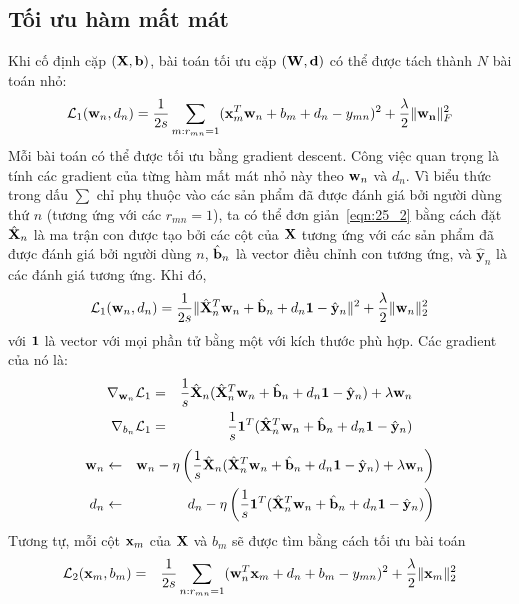\subsection{Tối ưu hàm mất mát }
Khi cố định cặp $(\mathbf{X}, \mathbf{b})$, bài toán tối ưu cặp $(\mathbf{W}, \mathbf{d})$ có thể được tách
thành $N$ bài toán nhỏ:
\begin{equation}
\label{eqn:25_2}
\mathcal{L}_1(\mathbf{w}_n, d_n) = \frac{1}{2s} \sum_{m:r_{mn} = 1}
(\mathbf{x}_m^T\mathbf{w}_n + b_m + d_n - y_{mn})^2 + \frac{\lambda}{2}
\|\mathbf{w_n}\|_F^2
\end{equation}
Mỗi bài toán có thể được tối ưu bằng gradient descent. Công việc quan trọng là tính các gradient của từng hàm mất mát nhỏ này theo $\mathbf{w}_n$ và
$d_n$.
Vì biểu thức trong dấu $\sum$ chỉ phụ thuộc vào các sản phẩm đã được đánh
giá bởi người dùng thứ $n$ (tương ứng với các $r_{mn}  = 1$), ta có thể đơn
giản~\eqref{eqn:25_2} bằng cách đặt $\hat{\mathbf{X}}_n$ là ma trận con được tạo bởi
các cột của $\mathbf{X}$ tương ứng với các sản phẩm đã được đánh giá bởi
người dùng $n$, $\hat{\mathbf{b}}_n$ là vector điều chỉnh con tương ứng, và
$\hat{\mathbf{y}}_n$ là các đánh giá tương ứng. Khi đó,
\begin{equation}
\mathcal{L}_1(\mathbf{w}_n, d_n) = \frac{1}{2s} \|\hat{\mathbf{X}}^T_n\mathbf{w}_n +
\hat{\mathbf{b}}_n
+ d_n\mathbf{1} - \hat{\mathbf{y}}_n\|^2 + \frac{\lambda}{2}\|\mathbf{w}_n\|_2^2
\end{equation}
với $\mathbf{1}$ là vector với mọi phần tử bằng một với kích thước phù hợp. Các gradient
của nó là:
\begin{eqnarray}
\nabla_{\mathbf{w}_n}\mathcal{L}_1
&=&
\frac{1}{s}\hat{\mathbf{X}}_n(\hat{\mathbf{X}}_n^T\mathbf{w}_n + \hat{\mathbf{b}}_n + d_n\mathbf{1} -
\hat{\mathbf{y}}_n) + \lambda \mathbf{w}_n \\\
\nabla_{b_n}\mathcal{L}_1
&=&
\frac{1}{s}\mathbf{1}^T(\hat{\mathbf{X}}_n^T\mathbf{w}_n + \hat{\mathbf{b}}_n + d_n\mathbf{1} -
\hat{\mathbf{y}}_n)
\end{eqnarray}
\begin{eqnarray}
\mathbf{w}_n &\leftarrow& \mathbf{w}_n - \eta \left(\frac{1}{s}\hat{\mathbf{X}}_n(\hat{\mathbf{X}}_n^T\mathbf{w}_n +
\hat{\mathbf{b}}_n + d_n\mathbf{1} - \hat{\mathbf{y}}_n) + \lambda \mathbf{w}_n\right) \\
d_n &\leftarrow& d_n - \eta \left(\frac{1}{s}\mathbf{1}^T(\hat{\mathbf{X}}_n^T\mathbf{w}_n + \hat{\mathbf{b}}_n + d_n\mathbf{1} -
\hat{\mathbf{y}}_n)\right)
\end{eqnarray}
Tương tự, mỗi cột $\mathbf{x}_m$ của $\mathbf{X}$ và $b_m$ sẽ được tìm bằng cách tối ưu bài toán
\begin{eqnarray}
\label{eqn:25_xm}
\mathcal{L}_2(\mathbf{x}_m, b_m) &=& \frac{1}{2s}\sum_{n:r_{mn} = 1}
(\mathbf{w}_n^T\mathbf{x}_m + d_n  + b_m - y_{mn})^2 + \frac{\lambda}{2}\|\mathbf{x}_m\|_2^2
\end{eqnarray}
